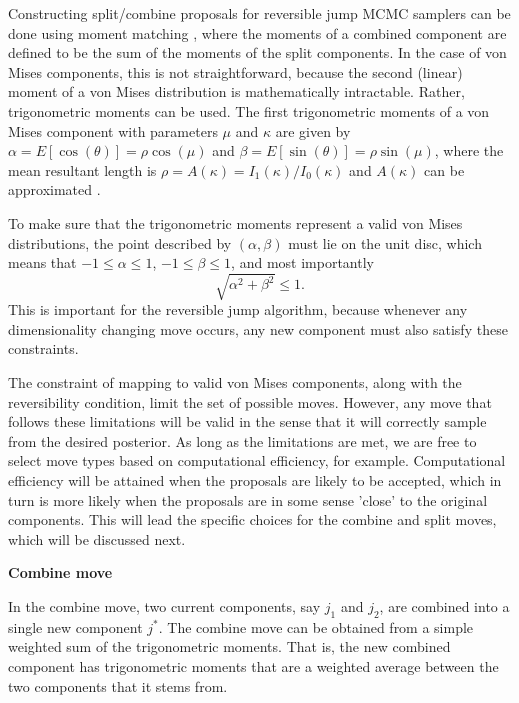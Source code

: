Constructing split/combine proposals for reversible jump MCMC samplers can be done using moment matching \citep{Anonymous:c60Je_7X}, where the moments of a combined component are defined to be the sum of the moments of the split components. In the case of von Mises components, this is not straightforward, because the second (linear) moment of a von Mises distribution is mathematically intractable. Rather, trigonometric moments can be used. The first trigonometric moments of a von Mises component with parameters $\mu$ and $\kappa$ are given by $\alpha = E[\cos(\theta)] = \rho\cos(\mu)$ and $\beta = E[\sin(\theta)] = \rho\sin(\mu)$, where the mean resultant length is $\rho = A(\kappa) = I_1(\kappa)/I_0(\kappa)$ and $A(\kappa)$ can be approximated \citep[p. 40]{Mardia2009}. 

To make sure that the trigonometric moments represent a valid von Mises distributions, the point described by $(\alpha, \beta)$ must lie on the unit disc, which means that $-1 \leq \alpha \leq 1$, $-1 \leq \beta \leq 1$, and most importantly
\begin{equation}
\label{eq:trigo-constraints}
\sqrt{\alpha^2 + \beta^2} \leq 1.
\end{equation}
This is important for the reversible jump algorithm, because whenever any dimensionality changing move occurs, any new component must also satisfy these constraints.

The constraint of mapping to valid von Mises components, along with the reversibility condition, limit the set of possible moves. However, any move that follows these limitations will be valid in the sense that it will correctly sample from the desired posterior. As long as the limitations are met, we are free to select move types based on computational efficiency, for example. Computational efficiency will be attained when the proposals are likely to be accepted, which in turn is more likely when the proposals are in some sense 'close' to the original components. This will lead the specific choices for the combine and split moves, which will be discussed next. 

\vspace{.4cm}

\textbf{Combine move}

In the combine move, two current components, say $j_1$ and $j_2$, are combined into a single new component $j^*$. The combine move can be obtained from a simple weighted sum of the trigonometric moments. That is, the new combined component has trigonometric moments that are a weighted average between the two components that it stems from.

